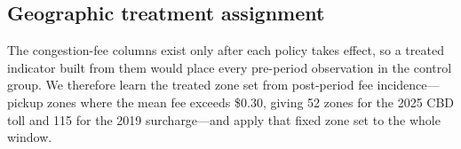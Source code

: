 \subsection{Geographic treatment assignment}
The congestion-fee columns exist only after each policy takes effect, so
a treated indicator built from them would place every pre-period
observation in the control group. We therefore learn the treated zone
set from post-period fee incidence---pickup zones where the mean fee
exceeds \$0.30, giving 52 zones for the 2025 CBD toll and 115 for the
2019 surcharge---and apply that fixed zone set to the whole window.
